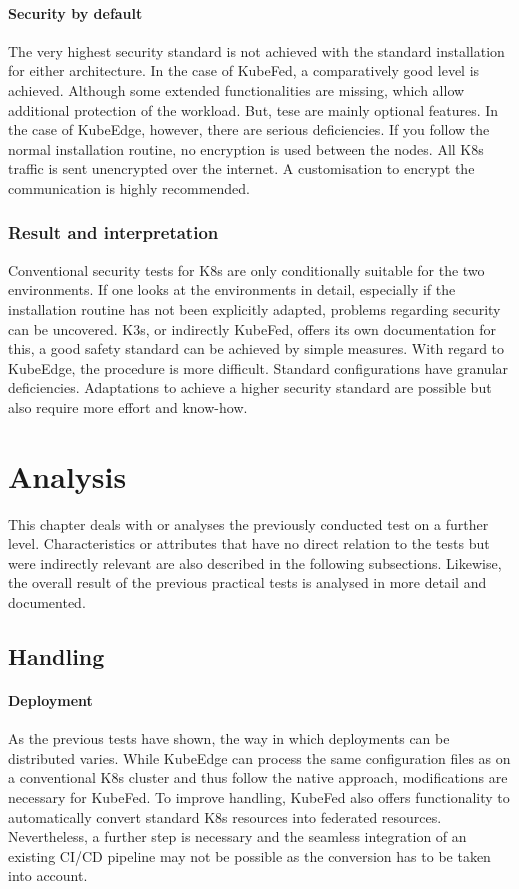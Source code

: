 \documentclass[MSC,Master,english]{twbook}%
\begin{document}
\paragraph{Security by default} The very highest security standard is not achieved with the standard installation for either architecture. In the case of KubeFed, a comparatively good level is achieved. Although some extended functionalities are missing, which allow additional protection of the workload. But, tese are mainly optional features. In the case of KubeEdge, however, there are serious deficiencies. If you follow the normal installation routine, no encryption is used between the nodes. All \ac{K8s} traffic is sent unencrypted over the internet. A customisation to encrypt the communication is highly recommended.

\subsubsection{Result and interpretation} Conventional security tests for \ac{K8s} are only conditionally suitable for the two environments. If one looks at the environments in detail, especially if the installation routine has not been explicitly adapted, problems regarding security can be uncovered. K3s, or indirectly KubeFed, offers its own documentation for this, a good safety standard can be achieved by simple measures. With regard to KubeEdge, the procedure is more difficult. Standard configurations have granular deficiencies. Adaptations to achieve a higher security standard are possible but also require more effort and know-how.

\section{Analysis}
\label{sec:dsranalysis}
This chapter deals with or analyses the previously conducted test on a further level. Characteristics or attributes that have no direct relation to the tests but were indirectly relevant are also described in the following subsections. Likewise, the overall result of the previous practical tests is analysed in more detail and documented.

\subsection{Handling}
\label{sec:handling}
\paragraph{Deployment} As the previous tests have shown, the way in which deployments can be distributed varies. While KubeEdge can process the same configuration files as on a conventional \ac{K8s} cluster and thus follow the native approach, modifications are necessary for KubeFed. To improve handling, KubeFed also offers functionality to automatically convert standard \ac{K8s} resources into federated resources. Nevertheless, a further step is necessary and the seamless integration of an existing CI/CD pipeline may not be possible as the conversion has to be taken into account.
\end{document}
